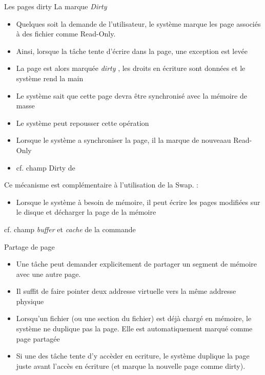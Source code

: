 \begin{frame}[fragile=singleslide]{Les pages dirty}
  La marque \emph{Dirty}
  \begin{itemize}
  \item Quelques  soit la demande de l'utilisateur,  le système marque
    les page associés à des fichier comme Read-Only.
  \item  Ainsi, lorsque  la tâche  tente  d'écrire dans  la page,  une
    exception est levée
  \item  La  page est  alors  marquée  \emph{dirty}  , les  droits  en
    écriture sont données et le système rend la main
  \item Le système sait que  cette page devra être synchronisé avec la
    mémoire de masse
  \item Le système peut repousser cette opération
  \item Lorsque  le système  a synchroniser la  page, il la  marque de
    nouveaau Read-Only
  \item cf. champ Dirty de 
  \end{itemize}
  Ce mécanisme est complémentaire à l'utilisation de la Swap. :
  \begin{itemize}
  \item Lorsque  le système  à besoin de  mémoire, il peut  écrire les
    pages modifiées sur le disque et décharger la page de la mémoire
  \end{itemize}
  cf.    champ   \emph{buffer}   et   \emph{cache}  de   la   commande
\end{frame}

\begin{frame}[fragile=singleslide]{Partage de page}
  \begin{itemize}
  \item Une  tâche peut demander explicitement de  partager un segment
    de mémoire avec une autre page.
  \item Il  suffit de  faire pointer deux  addresse virtuelle  vers la
    même addresse physique
  \item Lorsqu'un fichier (ou une  section du fichier) est déjà chargé
    en  mémoire,  le  système  ne  duplique  pas  la  page.  Elle  est
    automatiquement marqué comme page partagée
  \item Si  une des  tâche tente d'y  accèder en ecriture,  le système
    duplique la  page juste  avant l'accès en  écriture (et  marque la
    nouvelle page comme dirty).
  \end{itemize}
\end{frame}

